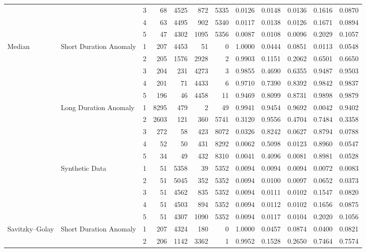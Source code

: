 \begin{table}[t]
{\begin{tabular}{|l|l|c|r|r|r|r|c|c|c|c|c|}
 &  & 3 & 68 & 4525 & 872 & 5335 & 0.0126 & 0.0148 & 0.0136 & 0.1616 & 0.0870 \\
 &  & 4 & 63 & 4495 & 902 & 5340 & 0.0117 & 0.0138 & 0.0126 & 0.1671 & 0.0894 \\
 &  & 5 & 47 & 4302 & 1095 & 5356 & 0.0087 & 0.0108 & 0.0096 & 0.2029 & 0.1057 \\
\hline
\multirow{15}{*}{Median} & \multirow{5}{*}{Short Duration Anomaly} & 1 & 207 & 4453 & 51 & 0 & 1.0000 & 0.0444 & 0.0851 & 0.0113 & 0.0548 \\
 &  & 2 & 205 & 1576 & 2928 & 2 & 0.9903 & 0.1151 & 0.2062 & 0.6501 & 0.6650 \\
 &  & 3 & 204 & 231 & 4273 & 3 & 0.9855 & 0.4690 & 0.6355 & 0.9487 & 0.9503 \\
 &  & 4 & 201 & 71 & 4433 & 6 & 0.9710 & 0.7390 & 0.8392 & 0.9842 & 0.9837 \\
 &  & 5 & 196 & 46 & 4458 & 11 & 0.9469 & 0.8099 & 0.8731 & 0.9898 & 0.9879 \\
\cline{2-12}
 & \multirow{5}{*}{Long Duration Anomaly} & 1 & 8295 & 479 & 2 & 49 & 0.9941 & 0.9454 & 0.9692 & 0.0042 & 0.9402 \\
 &  & 2 & 2603 & 121 & 360 & 5741 & 0.3120 & 0.9556 & 0.4704 & 0.7484 & 0.3358 \\
 &  & 3 & 272 & 58 & 423 & 8072 & 0.0326 & 0.8242 & 0.0627 & 0.8794 & 0.0788 \\
 &  & 4 & 52 & 50 & 431 & 8292 & 0.0062 & 0.5098 & 0.0123 & 0.8960 & 0.0547 \\
 &  & 5 & 34 & 49 & 432 & 8310 & 0.0041 & 0.4096 & 0.0081 & 0.8981 & 0.0528 \\
\cline{2-12}
 & \multirow{5}{*}{Synthetic Data} & 1 & 51 & 5358 & 39 & 5352 & 0.0094 & 0.0094 & 0.0094 & 0.0072 & 0.0083 \\
 &  & 2 & 51 & 5045 & 352 & 5352 & 0.0094 & 0.0100 & 0.0097 & 0.0652 & 0.0373 \\
 &  & 3 & 51 & 4562 & 835 & 5352 & 0.0094 & 0.0111 & 0.0102 & 0.1547 & 0.0820 \\
 &  & 4 & 51 & 4503 & 894 & 5352 & 0.0094 & 0.0112 & 0.0102 & 0.1656 & 0.0875 \\
 &  & 5 & 51 & 4307 & 1090 & 5352 & 0.0094 & 0.0117 & 0.0104 & 0.2020 & 0.1056 \\
\hline
\multirow{15}{*}{Savitzky--Golay} & \multirow{5}{*}{Short Duration Anomaly} & 1 & 207 & 4324 & 180 & 0 & 1.0000 & 0.0457 & 0.0874 & 0.0400 & 0.0821 \\
 &  & 2 & 206 & 1142 & 3362 & 1 & 0.9952 & 0.1528 & 0.2650 & 0.7464 & 0.7574 \\

\end{tabular}}
\end{table}
